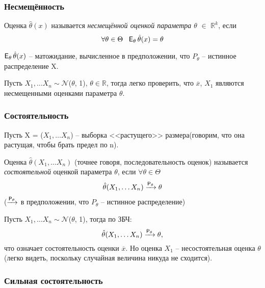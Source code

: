 \subsubsection{Несмещённость}
\begin{definition}
Оценка $\hat{\theta}(x)$ называется \emph{несмещённой оценкой параметра $\theta$} $\in$ $\mathbb{R}^k$, если
$$
    \forall \theta \in \Theta  \ \  \E_\theta \hat\theta(x) = \theta
$$
\end{definition}
\begin{remark}
    $\E_\theta \hat\theta(x)$ -- матожидание, вычисленное в предположении, что $P_{\theta}$ -- истинное распределение X.
\end{remark}
\begin{example}
    Пусть $X_1, \ldots X_n \sim \mathcal{N}$($\theta$, 1), $\theta \in \mathbb{R}$, тогда легко проверить, что $\overline{x}$, $X_1$ являются несмещенными оценками параметра $\theta$.
\end{example}

\vspace{3pt}

\subsubsection{Состоятельность}
\begin{definition}
    Пусть X = ($X_1, \ldots X_n$) -- выборка <<растущего>> размера(говорим, что она растущая, чтобы брать предел по n).
\end{definition}
\begin{definition}
Оценка $\hat\theta(X_1, \ldots X_n)$ (точнее говоря, последовательность оценок) называется \emph{состоятельной} оценкой параметра $\theta$, если $\forall \theta \in \Theta$
$$
    \hat\theta(X_1, \ldots X_n) \xrightarrow{\mathsf{P}_{\theta}} \theta
$$
($\xrightarrow{\mathsf{P}_{\theta}}$ в предположении, что $P_{\theta}$ -- истинное распределение)
\end{definition}

\begin{example}
Пусть $X_1, \ldots X_n \sim \mathcal{N}$($\theta$, 1), тогда по ЗБЧ:
$$
    \hat\theta(X_1, \ldots X_n) \xrightarrow{\mathsf{P}_{\theta}} \theta,
$$
что означает состоятельность оценки $\overline{x}$. Но оценка $X_1$ -- несостоятельная оценка $\theta$(легко видеть, поскольку случайная величина никуда не сходится).
\end{example}

\vspace{3pt}
\subsubsection{Сильная состоятельность}

